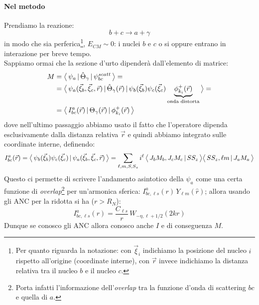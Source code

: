 \paragraph{Nel metodo}
Prendiamo la reazione:
$$b+c \to a+\gamma$$
in modo che sia perferica\footnote{Per quanto riguarda la notazione: con $\vec{\xi}_i$ indichiamo la posizione del nucleo $i$ rispetto all'origine (coordinate interne), con $\vec{r}$ invece indichiamo la distanza relativa tra il nucleo $b$ e il nucleo $c$.}, $E_{CM}\sim 0$: i nuclei $b$ e $c$ o si  oppure entrano in interazione per breve tempo.\\ 
Sappiamo ormai che la sezione d'urto dipenderà dall'elemento di matrice:
\begin{align*}
	M 
	&= \bigl\langle\, \psi_a\, |\,\hat{\Theta}_\gamma\, |\,\psi_{bc}^{scatt}\, \bigr\rangle =\\
	&= \bigl\langle\, \psi_a (\vec{\xi}_b,\vec{\xi}_c,\vec{r})\, |\,\hat{\Theta}_\gamma (	\vec{r})\, |\,\psi_{b}(\vec{\xi}_b)\psi_c(\vec{\xi}_c)\underbrace{\phi^+_{k_i}(\vec{r})}_\text{onda distorta}\, \bigr\rangle =\\ 
	&= \bigl\langle\, I_{bc}^a(\vec{r})\, |\,\Theta_\gamma(\vec{r})\, |\,\phi^+_{k_i}(\vec{r})\, \bigr\rangle
\end{align*}
dove nell'ultimo passaggio abbiamo usato il fatto che l'operatore dipenda esclusivamente dalla distanza relativa $\vec{r}$ e quindi abbiamo integrato sulle coordinate interne, definendo:
$$
I_{bc}^a (\vec{r}) = \bigl\langle\, \psi_b(\vec{\xi}_b)\psi_c(\vec{\xi}_c)\, |\, \psi_a(\vec{\xi}_b,\vec{\xi}_c,\vec{r})\, \bigr\rangle = \sum_{\ell,m,S,S_z} i^\ell \, \bigl\langle\, J_bM_b,J_cM_c\, |\, SS_z\, \bigr\rangle \bigl\langle\, SS_z, \ell m\, |\, J_aM_a\, \bigr\rangle
$$
Questo ci permette di scrivere l'andamento asintotico della $\psi_a$ come una certa funzione di \textit{overlap}\footnote{Porta infatti l'informazione dell'\textit{overlap} tra la funzione d'onda di scattering $bc$ e quella di $a$.} per un'armonica sferica: $I_{bc,\ell s}^a (r)\, Y_{\ell m}(\hat{r})$; allora usando gli ANC per la ridotta si ha ($r>R_N$):
$$I_{bc,\ell s}^a (r) = \frac{C_{\ell s}}{r} \, W_{-\eta,\ell+1/2} (2kr)$$%
Dunque se conosco gli ANC allora conosco anche $I$ e di conseguenza $M$.

